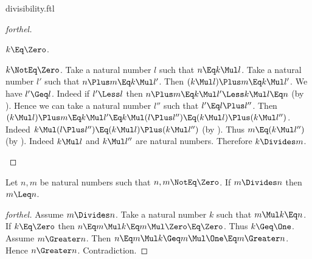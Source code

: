 \documentclass{stex}
\begin{document}
\begin{smodule}{divisibility.ftl}
\begin{proof}[forthel]
  \begin{case}{$k \Eq \Zero$.} \end{case}

  \begin{case}{$k \NotEq \Zero$.}
    Take a natural number $l$ such that $n \Eq k \Mul l$.
    Take a natural number $l'$ such that $n \Plus m \Eq k \Mul l'$.
    Then $(k \Mul l) \Plus m \Eq k \Mul l'$.
    We have $l' \Geq l$.
    Indeed if $l' \Less l$ then
    $n \Plus m
      \Eq k \Mul l'
      \Less k \Mul l
      \Eq n$ (by ).
    Hence we can take a natural number $l''$ such that $l' \Eq l \Plus l''$.
    Then $(k \Mul l) \Plus m
      \Eq k \Mul l'
      \Eq k \Mul (l \Plus l'')
      \Eq (k \Mul l) \Plus (k \Mul l'')$.
    Indeed $k \Mul (l \Plus l'') \Eq (k \Mul l) \Plus (k \Mul l'')$ (by ).
    Thus $m \Eq (k \Mul l'')$ (by ).
    Indeed $k \Mul l$ and $k \Mul l''$ are natural numbers.
    Therefore $k \Divides m$.
  \end{case}
\end{proof}

\begin{proposition*}[forthel]
  Let $n, m$ be natural numbers such that $n, m \NotEq \Zero$.
  If $m \Divides n$ then $m \Leq n$.
\end{proposition*}
\begin{proof}[forthel]
  Assume $m \Divides n$.
  Take a natural number $k$ such that $m \Mul k \Eq n$.
  If $k \Eq \Zero$ then
  $n
    \Eq m \Mul k
    \Eq m \Mul \Zero
    \Eq \Zero$.
  Thus $k \Geq \One$.
  Assume $m \Greater n$.
  Then $n
    \Eq m \Mul k
    \Geq m \Mul \One
    \Eq m
    \Greater n$.
  Hence $n \Greater n$.
  Contradiction.
\end{proof}

\end{smodule}
\end{document}
